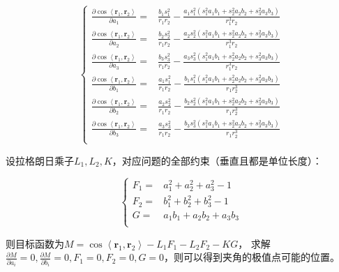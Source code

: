 \documentclass[UTF8,zihao=5]{ctexart}
\newcommand{\bm}[1]{{\mathbf{#1}}}
\newcommand*{\pd}[2]{\frac{\partial #1}{\partial #2}}
\begin{document}
\begin{equation}
    \left\{
        \begin{aligned}
            \pd{\cos{\left\langle \bm{r}_1,\bm{r}_2 \right\rangle}}{a_1}
            = & \frac{b_1s_1^2}{r_1r_2} -
            \frac{a_1s_1^2(s_1^2a_1b_1 + s_2^2a_2b_2 + s_3^2a_3b_3)}{r_1^3r_2}\\
            \pd{\cos{\left\langle \bm{r}_1,\bm{r}_2 \right\rangle}}{a_2}
            = & \frac{b_2s_2^2}{r_1r_2} -
            \frac{a_2s_2^2(s_1^2a_1b_1 + s_2^2a_2b_2 + s_3^2a_3b_3)}{r_1^3r_2}\\
            \pd{\cos{\left\langle \bm{r}_1,\bm{r}_2 \right\rangle}}{a_3}
            = & \frac{b_3s_3^2}{r_1r_2} -
            \frac{a_3s_3^2(s_1^2a_1b_1 + s_2^2a_2b_2 + s_3^2a_3b_3)}{r_1^3r_2}\\
            \pd{\cos{\left\langle \bm{r}_1,\bm{r}_2 \right\rangle}}{b_1}
            = & \frac{a_1s_1^2}{r_1r_2} -
            \frac{b_1s_1^2(s_1^2a_1b_1 + s_2^2a_2b_2 + s_3^2a_3b_3)}{r_1r_2^3}\\
            \pd{\cos{\left\langle \bm{r}_1,\bm{r}_2 \right\rangle}}{b_2}
            = & \frac{a_2s_2^2}{r_1r_2} -
            \frac{b_2s_2^2(s_1^2a_1b_1 + s_2^2a_2b_2 + s_3^2a_3b_3)}{r_1r_2^3}\\
            \pd{\cos{\left\langle \bm{r}_1,\bm{r}_2 \right\rangle}}{b_3}
            = & \frac{a_3s_3^2}{r_1r_2} -
            \frac{b_3s_3^2(s_1^2a_1b_1 + s_2^2a_2b_2 + s_3^2a_3b_3)}{r_1r_2^3}\\
        \end{aligned}
    \right.
\end{equation}

设拉格朗日乘子$L_1,L_2,K$，对应问题的全部约束（垂直且都是单位长度）：

\begin{equation}
    \left\{
        \begin{aligned}
            F_1= & a_1^2+a_2^2+a_3^2-1\\
            F_2= & b_1^2+b_2^2+b_3^2-1\\
            G= & a_1b_1 + a_2b_2 + a_3b_3\\
        \end{aligned}
    \right.
\end{equation}

则目标函数为$M = \cos{\left\langle \bm{r}_1,\bm{r}_2 \right\rangle} - L_1F_1 - L_2F_2 - KG$，
求解$\pd{M}{a_i}=0, \pd{M}{b_i}=0, F_1=0, F_2=0, G=0$，则可以得到夹角的极值点可能的位置。
\end{document}
